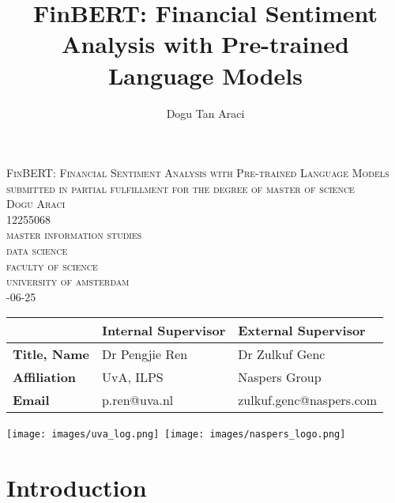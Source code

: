 \documentclass[sigconf]{acmart}
\begin{document}
\begin{titlepage}
\begin{center}
 
\textsc{\Large  FinBERT: Financial Sentiment Analysis with Pre-trained Language Models }
\bigskip
\\
\textsc{\large
submitted in partial fulfillment for the degree of master of science\\
\bigskip
Dogu Araci\\
12255068\\
\bigskip
master information studies\\
data science \\
faculty of science\\
university of amsterdam\\
-06-25
}
\end{center}
 
\vfill
\begin{center}
\begin{tabular}{|l||ll|}
\hline
 & \textbf{Internal  Supervisor} & \textbf{External   Supervisor}  \\   
 \hline
\textbf{Title, Name} & Dr Pengjie Ren& Dr Zulkuf Genc  \\
\textbf{Affiliation} &UvA, ILPS & Naspers Group\\ 
\textbf{Email} & p.ren@uva.nl&zulkuf.genc@naspers.com \\
\hline
\end{tabular}
\end{center}
\bigskip
\begin{center}
\mbox{\texttt{[image: images/uva\_log.png]} 
\texttt{[image: images/naspers\_logo.png]} }
\end{center}
\end{titlepage}

\title{FinBERT: Financial Sentiment Analysis with Pre-trained Language Models}
\author{Dogu Tan Araci}

\begin{abstract}
    
    
    
\end{abstract}





\maketitle

\section{Introduction}

    
    
    
    
    
    
    





\end{document}
